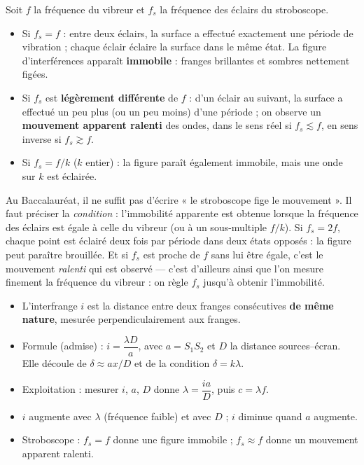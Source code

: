 \documentclass[11pt]{article}
\newcommand{\cle}[1]{{\popxbold\color{popdark}#1}}
\begin{document}
\begin{propriete}
Soit $f$ la fréquence du vibreur et $f_s$ la fréquence des éclairs du stroboscope.
\begin{itemize}
\item Si $f_s = f$ : entre deux éclairs, la surface a effectué exactement une période de vibration ; chaque éclair éclaire la surface dans le même état. La figure d'interférences apparaît \textbf{immobile} : franges brillantes et sombres nettement figées.
\item Si $f_s$ est \textbf{légèrement différente} de $f$ : d'un éclair au suivant, la surface a effectué un peu plus (ou un peu moins) d'une période ; on observe un \textbf{mouvement apparent ralenti} des ondes, dans le sens réel si $f_s \lesssim f$, en sens inverse si $f_s \gtrsim f$.
\item Si $f_s = f/k$ ($k$ entier) : la figure paraît également immobile, mais une onde sur $k$ est éclairée.
\end{itemize}
\end{propriete}

\begin{attention}
Au Baccalauréat, il ne suffit pas d'écrire « le stroboscope fige le mouvement ». Il faut préciser la \emph{condition} : l'immobilité apparente est obtenue lorsque la fréquence des éclairs est égale à celle du vibreur (ou à un sous-multiple $f/k$). Si $f_s = 2f$, chaque point est éclairé deux fois par période dans deux états opposés : la figure peut paraître brouillée. Et si $f_s$ est proche de $f$ sans lui être égale, c'est le mouvement \emph{ralenti} qui est observé — c'est d'ailleurs ainsi que l'on mesure finement la fréquence du vibreur : on règle $f_s$ jusqu'à obtenir l'immobilité.
\end{attention}

\begin{aretenir}
\begin{itemize}
\item L'\cle{interfrange} $i$ est la distance entre deux franges consécutives \textbf{de même nature}, mesurée perpendiculairement aux franges.
\item Formule (admise) : $i = \dfrac{\lambda D}{a}$, avec $a = S_1S_2$ et $D$ la distance sources--écran. Elle découle de $\delta \approx ax/D$ et de la condition $\delta = k\lambda$.
\item Exploitation : mesurer $i$, $a$, $D$ donne $\lambda = \dfrac{ia}{D}$, puis $c = \lambda f$.
\item $i$ augmente avec $\lambda$ (fréquence faible) et avec $D$ ; $i$ diminue quand $a$ augmente.
\item Stroboscope : $f_s = f$ donne une figure immobile ; $f_s \approx f$ donne un mouvement apparent ralenti.
\end{itemize}
\end{aretenir}
\end{document}
